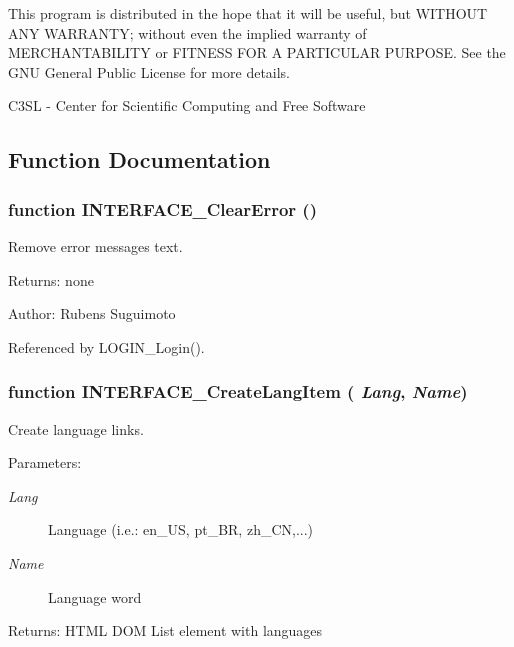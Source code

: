 This program is distributed in the hope that it will be useful, but WITHOUT ANY WARRANTY; without even the implied warranty of MERCHANTABILITY or FITNESS FOR A PARTICULAR PURPOSE. See the GNU General Public License for more details.

C3SL - Center for Scientific Computing and Free Software 

\subsection{Function Documentation}
\subsubsection[INTERFACE\_\-ClearError]{\setlength{\rightskip}{0pt plus 5cm}function INTERFACE\_\-ClearError ()}\label{interface_2login_8js_377bfb8832549d5a0b93dde3afea233f}


Remove error messages text. 

\begin{Desc}
\item[Returns:]none \end{Desc}
\begin{Desc}
\item[Author:]Rubens Suguimoto \end{Desc}


Referenced by LOGIN\_\-Login().
\subsubsection[INTERFACE\_\-CreateLangItem]{\setlength{\rightskip}{0pt plus 5cm}function INTERFACE\_\-CreateLangItem ( {\em Lang}, \/   {\em Name})}\label{interface_2login_8js_4ba00e3764bd3e83ef908d5edd43d993}


Create language links. 

\begin{Desc}
\item[Parameters:]
\begin{description}
\item[{\em Lang}]Language (i.e.: en\_\-US, pt\_\-BR, zh\_\-CN,...) \item[{\em Name}]Language word \end{description}
\end{Desc}
\begin{Desc}
\item[Returns:]HTML DOM List element with languages \end{Desc}


